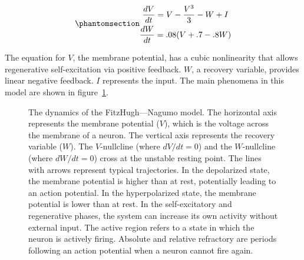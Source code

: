 \documentclass[
  a4paper,
  DIV=11,
  numbers=noendperiod,
  oneside]{scrreprt}
\begin{document}
\begin{equation}\phantomsection\label{eq-ch4n-16-old-36}{
\begin{gathered}
\frac{dV}{dt} = V - \frac{V^{3}}{3} - W + I \\ 
\frac{dW}{dt} = .08(V + .7 - .8W)
\end{gathered}}\end{equation}

The equation for \(V\), the membrane potential, has a cubic nonlinearity
that allows regenerative self-excitation via positive feedback. \(W\), a
recovery variable, provides linear negative feedback. \(I\) represents
the input. The main phenomena in this model are shown in
figure~\ref{fig-ch4n-img15-old-63}.

\begin{figure}


\caption{\label{fig-ch4n-img15-old-63}The dynamics of the
FitzHugh---Nagumo model. The horizontal axis represents the membrane
potential (\(V\)), which is the voltage across the membrane of a neuron.
The vertical axis represents the recovery variable (\(W\)). The
\(V\)-nullcline (where \(dV/dt = 0\)) and the \(W\)-nullcline (where
\(dW/dt = 0\)) cross at the unstable resting point. The lines with
arrows represent typical trajectories. In the depolarized state, the
membrane potential is higher than at rest, potentially leading to an
action potential. In the hyperpolarized state, the membrane potential is
lower than at rest. In the self-excitatory and regenerative phases, the
system can increase its own activity without external input. The active
region refers to a state in which the neuron is actively firing.
Absolute and relative refractory are periods following an action
potential when a neuron cannot fire again.}

\end{figure}%
\end{document}
